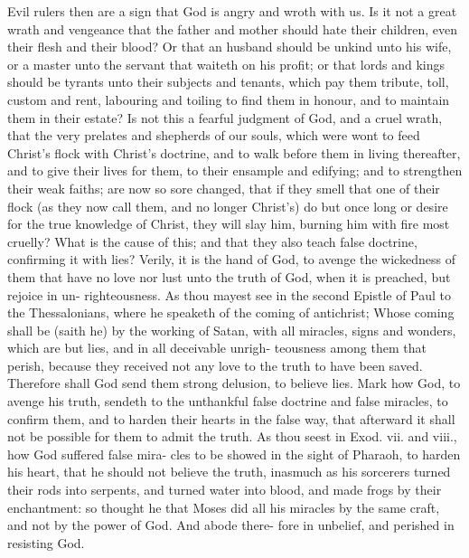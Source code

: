 \documentclass{custom}
\begin{document}
Evil rulers then are a sign that God is angry and wroth
with us. Is it not a great wrath and vengeance that the
father and mother should hate their children, even their
flesh and their blood? Or that an husband should be 
unkind unto his wife, or a master unto the servant that 
waiteth on his profit; or that lords and kings should be 
tyrants unto their subjects and tenants, which pay them 
tribute, toll, custom and rent, labouring and toiling to 
find them in honour, and to maintain them in their estate?
Is not this a fearful judgment of God, and a cruel wrath, 
that the very prelates and shepherds of our souls, which 
were wont to feed Christ's flock with Christ's doctrine, 
and to walk before them in living thereafter, and to give 
their lives for them, to their ensample and edifying; and 
to strengthen their weak faiths; are now so sore changed, 
that if they smell that one of their flock (as they now call 
them, and no longer Christ's) do but once long or desire 
for the true knowledge of Christ, they will slay him, 
burning him with fire most cruelly? What is the cause
of this; and that they also teach false doctrine, confirming
it with lies? Verily, it is the hand of God, to avenge the 
wickedness of them that have no love nor lust unto the 
truth of God, when it is preached, but rejoice in un-
righteousness. As thou mayest see in the second Epistle 
of Paul to the Thessalonians, where he speaketh of the 
coming of antichrist; Whose coming shall be (saith he)
by the working of Satan, with all miracles, signs and 
wonders, which are but lies, and in all deceivable unrigh-
teousness among them that perish, because they received 
not any love to the truth to have been saved. Therefore 
shall God send them strong delusion, to believe lies. Mark 
how God, to avenge his truth, sendeth to the unthankful 
false doctrine and false miracles, to confirm them, and to 
harden their hearts in the false way, that afterward it shall 
not be possible for them to admit the truth. As thou
seest in Exod. vii. and viii., how God suffered false mira- 
cles to be showed in the sight of Pharaoh, to harden his 
heart, that he should not believe the truth, inasmuch as 
his sorcerers turned their rods into serpents, and turned 
water into blood, and made frogs by their enchantment:
so thought he that Moses did all his miracles by the same 
craft, and not by the power of God. And abode there- 
fore in unbelief, and perished in resisting God.
\end{document}
